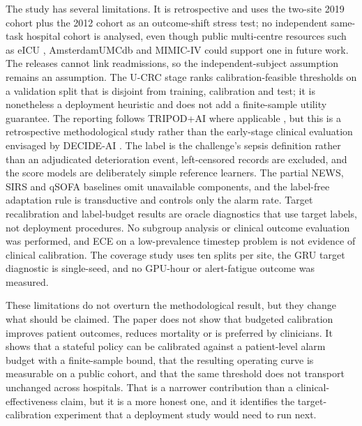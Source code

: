 The study has several limitations. It is retrospective and uses the two-site 2019 cohort plus the 2012 cohort as an outcome-shift stress test; no independent same-task hospital cohort is analysed, even though public multi-centre resources such as eICU \citep{pollard2018eicu}, AmsterdamUMCdb \citep{thoral2021amsterdam} and MIMIC-IV \citep{johnson2023mimic} could support one in future work. The releases cannot link readmissions, so the independent-subject assumption remains an assumption. The U-CRC stage ranks calibration-feasible thresholds on a validation split that is disjoint from training, calibration and test; it is nonetheless a deployment heuristic and does not add a finite-sample utility guarantee. The reporting follows TRIPOD+AI where applicable \citep{collins2024tripod}, but this is a retrospective methodological study rather than the early-stage clinical evaluation envisaged by DECIDE-AI \citep{vasey2022decide}. The label is the challenge's sepsis definition rather than an adjudicated deterioration event, left-censored records are excluded, and the score models are deliberately simple reference learners. The partial NEWS, SIRS and qSOFA baselines omit unavailable components, and the label-free adaptation rule is transductive and controls only the alarm rate. Target recalibration and label-budget results are oracle diagnostics that use target labels, not deployment procedures. No subgroup analysis or clinical outcome evaluation was performed, and ECE on a low-prevalence timestep problem is not evidence of clinical calibration. The coverage study uses ten splits per site, the GRU target diagnostic is single-seed, and no GPU-hour or alert-fatigue outcome was measured.

These limitations do not overturn the methodological result, but they change what should be claimed. The paper does not show that budgeted calibration improves patient outcomes, reduces mortality or is preferred by clinicians. It shows that a stateful policy can be calibrated against a patient-level alarm budget with a finite-sample bound, that the resulting operating curve is measurable on a public cohort, and that the same threshold does not transport unchanged across hospitals. That is a narrower contribution than a clinical-effectiveness claim, but it is a more honest one, and it identifies the target-calibration experiment that a deployment study would need to run next.

